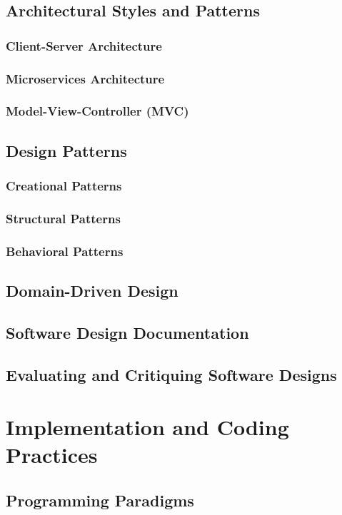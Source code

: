 \begin{refsection}
\subsection{Architectural Styles and Patterns}
\subsubsection{Client-Server Architecture}
\subsubsection{Microservices Architecture}
\subsubsection{Model-View-Controller (MVC)}
\subsection{Design Patterns}
\subsubsection{Creational Patterns}
\subsubsection{Structural Patterns}
\subsubsection{Behavioral Patterns}
\subsection{Domain-Driven Design}
\subsection{Software Design Documentation}
\subsection{Evaluating and Critiquing Software Designs}

\newpage

\section{Implementation and Coding Practices}
\subsection{Programming Paradigms}

\end{refsection}
